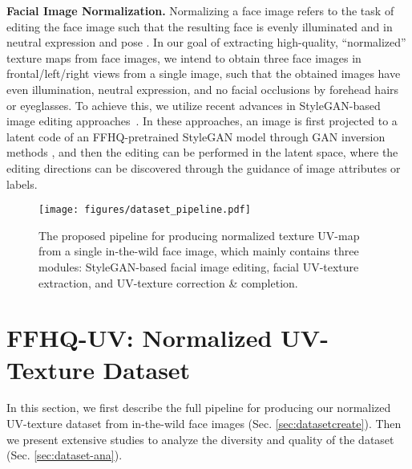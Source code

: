 \documentclass[10pt,twocolumn,letterpaper]{article}
\begin{document}
\vspace{1mm}
\noindent\textbf{Facial Image Normalization.}
Normalizing a face image refers to the task of editing the face image such that the resulting face is evenly illuminated and in neutral expression and pose \cite{cole2017synthesizing,nagano2019deep}. 
In our goal of extracting high-quality, ``normalized'' texture maps from face images, we intend to obtain three face images in frontal/left/right views from a single image, such that the obtained images have even illumination, neutral expression, and no facial occlusions by forehead hairs or eyeglasses. 
To achieve this, we utilize recent advances in StyleGAN-based image editing approaches~\cite{abdal2021styleflow,shen2020interpreting,harkonen2020ganspace,patashnik2021styleclip}. 
In these approaches, an image is first projected to a latent code of an FFHQ-pretrained StyleGAN \cite{karras2019style,karras2020analyzing} model through GAN inversion methods \cite{richardson2021encoding,tov2021designing}, and then the editing can be performed in the latent space, where the editing directions can be discovered through the guidance of image attributes or labels. 



\begin{figure*}[!t]
  \centering
   \texttt{[image: figures/dataset\_pipeline.pdf]}
   \caption{The proposed pipeline for producing normalized texture UV-map from a single in-the-wild face image, which mainly contains three modules: StyleGAN-based facial image editing, facial UV-texture extraction, and UV-texture correction \& completion.
   }
   \label{fig:dataset-pipeline}
\end{figure*}




\section{FFHQ-UV: Normalized UV-Texture Dataset}
\label{sec:dataset-pipeline}


In this section, we first describe the full pipeline for producing our normalized UV-texture dataset from in-the-wild face images (Sec. \ref{sec:datasetcreate}). 
Then we present extensive studies to analyze the diversity and quality of the dataset (Sec. \ref{sec:dataset-ana}). 
\end{document}
